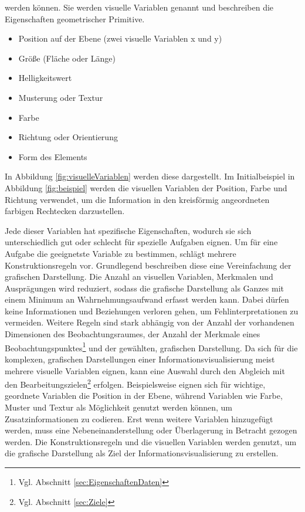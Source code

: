 \documentclass[a4paper, 
               12pt,
               DIV=calc,
               version=first,
               pdftex,
               headsepline,
               footsepline,
               bibliography=totocnumbered,
               listof=numbered]{scrreprt}
\begin{document}
werden können. Sie werden visuelle Variablen genannt und beschreiben die Eigenschaften geometrischer Primitive.
\begin{itemize}
\item Position auf der Ebene (zwei visuelle Variablen x und y)
\item Größe (Fläche oder Länge)
\item Helligkeitswert
\item Musterung oder Textur
\item Farbe
\item Richtung oder Orientierung
\item Form des Elements
\end{itemize}
In Abbildung \ref{fig:visuelleVariablen} werden diese dargestellt. Im Initialbeispiel in Abbildung
\ref{fig:beispiel} werden die visuellen Variablen der Position, Farbe und Richtung verwendet,
um die Information in den kreisförmig angeordneten farbigen Rechtecken darzustellen.

Jede dieser Variablen hat spezifische Eigenschaften, wodurch sie sich unterschiedlich gut oder schlecht
für spezielle Aufgaben eignen. Um für eine Aufgabe die geeignetste Variable zu bestimmen, schlägt
\cite{Bertin} mehrere Konstruktionsregeln vor.
Grundlegend beschreiben diese eine Vereinfachung der grafischen Darstellung.
Die Anzahl an visuellen Variablen, Merkmalen und Ausprägungen wird reduziert,
sodass die grafische Darstellung als Ganzes mit einem Minimum an Wahrnehmungsaufwand erfasst werden kann.
Dabei dürfen keine Informationen und Beziehungen verloren gehen, um Fehlinterpretationen
zu vermeiden. Weitere Regeln sind stark abhängig von der Anzahl
der vorhandenen Dimensionen des Beobachtungsraumes, der Anzahl der Merkmale eines
Beobachtungspunktes\footnote{Vgl. Abschnitt \ref{sec:EigenschaftenDaten}} und der gewählten,
grafischen Darstellung. Da sich für die komplexen, grafischen Darstellungen einer 
Informationsvisualisierung meist mehrere visuelle Variablen eignen, kann eine Auswahl
durch den Abgleich mit den Bearbeitungszielen\footnote{Vgl. Abschnitt \ref{sec:Ziele}} erfolgen.
Beispielsweise eignen sich für wichtige, geordnete Variablen die Position in der Ebene,
während Variablen wie Farbe, Muster und Textur als Möglichkeit genutzt werden können, um Zusatzinformationen zu codieren.
Erst wenn weitere Variablen hinzugefügt werden, muss eine Nebeneinanderstellung oder
Überlagerung in Betracht gezogen werden.
Die Konstruktionsregeln und die visuellen Variablen werden genutzt, um
die grafische Darstellung als Ziel der Informationsvisualisierung zu erstellen.
\end{document}
